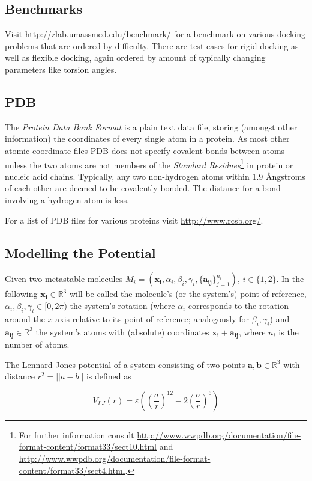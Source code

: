 \subsection{Benchmarks}
Visit \url{http://zlab.umassmed.edu/benchmark/} for a benchmark on various docking problems that are ordered by difficulty. There are test cases for rigid docking as well as flexible docking, again ordered by amount of typically changing parameters like torsion angles.

\subsection{PDB}
The \textit{Protein Data Bank Format} is a plain text data file, storing (amongst other information) the coordinates of every single atom in a protein. As most other atomic coordinate files PDB does not specify covalent bonds between atoms unless the two atoms are not members of the \textit{Standard Residues}\footnote{For further information consult \url{http://www.wwpdb.org/documentation/file-format-content/format33/sect10.html} and \url{http://www.wwpdb.org/documentation/file-format-content/format33/sect4.html}.} in protein or nucleic acid chains. Typically, any two non-hydrogen atoms within 1.9 \AA ngstroms of each other are deemed to be covalently bonded. The distance for a bond involving a hydrogen atom is less.

For a list of PDB files for various proteins visit \url{http://www.rcsb.org/}.

\subsection{Modelling the Potential}
Given two metastable molecules $M_i=(\mathbf{x_i},\alpha_i,\beta_i,\gamma_i,\{\mathbf{a_{ij}}\}_{j=1}^{n_i})$, $i\in\{1,2\}$. In the following $\mathbf{x_i}\in\mathbb R^3$ will be called the molecule's (or the system's) point of reference, $\alpha_i,\beta_i,\gamma_i\in [0,2\pi)$ the system's rotation (where $\alpha_i$ corresponds to the rotation around the $x$-axis relative to its point of reference; analogously for $\beta_i, \gamma_i$) and $\mathbf{a_{ij}}\in\mathbb R^3$ the system's atoms with (absolute) coordinates $\mathbf{x_i}+\mathbf{a_{ij}}$, where $n_i$ is the number of atoms.

The Lennard-Jones potential of a system consisting of two points $\mathbf{a,b}\in\mathbb R^3$ with distance $r^2=||a-b||$ is defined as

\begin{equation}\label{LennardJones}
	V_{LJ}(r) = \varepsilon \left(\left(\frac{\sigma}{r}\right)^{12} - 2 \left(\frac{\sigma}{r}\right)^6\right)
\end{equation}

